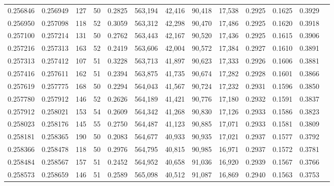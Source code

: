 \begin{tabular}{rrrrrrrrrrrrr}
0.256846 & 0.256949 &   127 &  50 &                                     0.2825 & 563,194 &  42,416 &  90,418 &  17,538 & 0.2925 & 0.1625 & 0.3929 \\
0.256950 & 0.257098 &   118 &  52 &                                     0.3059 & 563,312 &  42,298 &  90,470 &  17,486 & 0.2925 & 0.1620 & 0.3918 \\
0.257100 & 0.257214 &   131 &  50 &                                     0.2762 & 563,443 &  42,167 &  90,520 &  17,436 & 0.2925 & 0.1615 & 0.3906 \\
0.257216 & 0.257313 &   163 &  52 &                                     0.2419 & 563,606 &  42,004 &  90,572 &  17,384 & 0.2927 & 0.1610 & 0.3891 \\
0.257313 & 0.257412 &   107 &  51 &                                     0.3228 & 563,713 &  41,897 &  90,623 &  17,333 & 0.2926 & 0.1606 & 0.3881 \\
0.257416 & 0.257611 &   162 &  51 &                                     0.2394 & 563,875 &  41,735 &  90,674 &  17,282 & 0.2928 & 0.1601 & 0.3866 \\
0.257619 & 0.257775 &   168 &  50 &                                     0.2294 & 564,043 &  41,567 &  90,724 &  17,232 & 0.2931 & 0.1596 & 0.3850 \\
0.257780 & 0.257912 &   146 &  52 &                                     0.2626 & 564,189 &  41,421 &  90,776 &  17,180 & 0.2932 & 0.1591 & 0.3837 \\
0.257912 & 0.258021 &   153 &  54 &                                     0.2609 & 564,342 &  41,268 &  90,830 &  17,126 & 0.2933 & 0.1586 & 0.3823 \\
0.258023 & 0.258176 &   145 &  55 &                                     0.2750 & 564,487 &  41,123 &  90,885 &  17,071 & 0.2933 & 0.1581 & 0.3809 \\
0.258181 & 0.258365 &   190 &  50 &                                     0.2083 & 564,677 &  40,933 &  90,935 &  17,021 & 0.2937 & 0.1577 & 0.3792 \\
0.258366 & 0.258478 &   118 &  50 &                                     0.2976 & 564,795 &  40,815 &  90,985 &  16,971 & 0.2937 & 0.1572 & 0.3781 \\
0.258484 & 0.258567 &   157 &  51 &                                     0.2452 & 564,952 &  40,658 &  91,036 &  16,920 & 0.2939 & 0.1567 & 0.3766 \\
0.258573 & 0.258659 &   146 &  51 &                                     0.2589 & 565,098 &  40,512 &  91,087 &  16,869 & 0.2940 & 0.1563 & 0.3753 \\

\end{tabular}
